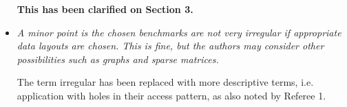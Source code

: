 \documentclass[12pt,a4paper,notitlepage]{article}
\begin{document}
\begin{itemize}
\textbf{This has been clarified on Section 3.}

\item \textit{A minor point is the chosen benchmarks are not very irregular if appropriate data layouts are chosen.  This is fine, but the authors may consider other possibilities such as graphs and sparse matrices.}

The term irregular has been replaced with more descriptive terms, i.e. application with holes in their access pattern, as also noted by Referee 1. 

\end{itemize}



  
\end{document}
